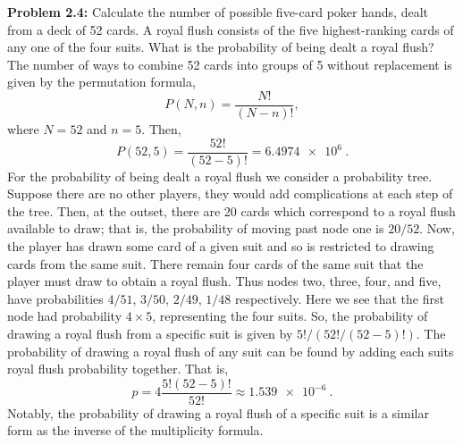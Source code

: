 \documentclass[a4paper, 12pt]{config/homework}
\begin{document}
\pagebreak\noindent
\textbf{Problem 2.4:} Calculate the number of possible five-card poker hands, dealt from a deck of 52 cards. A royal flush consists of the five highest-ranking cards of any one of the four suits. What is the probability of being dealt a royal flush?
\bigskip\noindent\\
The number of ways to combine 52 cards into groups of 5 without replacement is given by the permutation formula,
\[P(N,n)=\frac{N!}{(N-n)!},\]
where \(N=52\) and \(n=5\). Then,
\[P(52,5) = \frac{52!}{(52-5)!} = \qty{6.4974e+6}{}.\]
For the probability of being dealt a royal flush we consider a probability tree. Suppose there are no other players, they would add complications at each step of the tree. Then, at the outset, there are 20 cards which correspond to a royal flush available to draw; that is, the probability of moving past node one is \(20/52\). Now, the player has drawn some card of a given suit and so is restricted to drawing cards from the same suit. There remain four cards of the same suit that the player must draw to obtain a royal flush. Thus nodes two, three, four, and five, have probabilities \(4/51\), \(3/50\), \(2/49\), \(1/48\) respectively. Here we see that the first node had probability \(4\times 5\), representing the four suits. So, the probability of drawing a royal flush from a specific suit is given by \(5!/(52!/(52-5)!)\). The probability of drawing a royal flush of any suit can be found by adding each suits royal flush probability together. That is,
\[p = 4\frac{5!(52-5)!}{52!} \approx \qty{1.539e-6}{}.\]
Notably, the probability of drawing a royal flush of a specific suit is a similar form as the inverse of the multiplicity formula.


\end{document}
